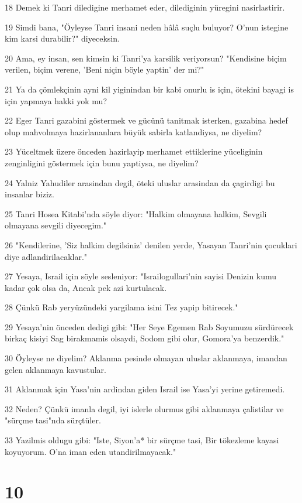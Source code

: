 \par 18 Demek ki Tanri diledigine merhamet eder, dilediginin yüregini nasirlastirir.
\par 19 Simdi bana, "Öyleyse Tanri insani neden hâlâ suçlu buluyor? O'nun istegine kim karsi durabilir?" diyeceksin.
\par 20 Ama, ey insan, sen kimsin ki Tanri'ya karsilik veriyorsun? "Kendisine biçim verilen, biçim verene, 'Beni niçin böyle yaptin' der mi?"
\par 21 Ya da çömlekçinin ayni kil yiginindan bir kabi onurlu is için, ötekini bayagi is için yapmaya hakki yok mu?
\par 22 Eger Tanri gazabini göstermek ve gücünü tanitmak isterken, gazabina hedef olup mahvolmaya hazirlananlara büyük sabirla katlandiysa, ne diyelim?
\par 23 Yüceltmek üzere önceden hazirlayip merhamet ettiklerine yüceliginin zenginligini göstermek için bunu yaptiysa, ne diyelim?
\par 24 Yalniz Yahudiler arasindan degil, öteki uluslar arasindan da çagirdigi bu insanlar biziz.
\par 25 Tanri Hosea Kitabi'nda söyle diyor: "Halkim olmayana halkim, Sevgili olmayana sevgili diyecegim."
\par 26 "Kendilerine, 'Siz halkim degilsiniz' denilen yerde, Yasayan Tanri'nin çocuklari diye adlandirilacaklar."
\par 27 Yesaya, Israil için söyle sesleniyor: "Israilogullari'nin sayisi Denizin kumu kadar çok olsa da, Ancak pek azi kurtulacak.
\par 28 Çünkü Rab yeryüzündeki yargilama isini Tez yapip bitirecek."
\par 29 Yesaya'nin önceden dedigi gibi: "Her Seye Egemen Rab Soyumuzu sürdürecek birkaç kisiyi Sag birakmamis olsaydi, Sodom gibi olur, Gomora'ya benzerdik."
\par 30 Öyleyse ne diyelim? Aklanma pesinde olmayan uluslar aklanmaya, imandan gelen aklanmaya kavustular.
\par 31 Aklanmak için Yasa'nin ardindan giden Israil ise Yasa'yi yerine getiremedi.
\par 32 Neden? Çünkü imanla degil, iyi islerle olurmus gibi aklanmaya çalistilar ve "sürçme tasi"nda sürçtüler.
\par 33 Yazilmis oldugu gibi: "Iste, Siyon'a* bir sürçme tasi, Bir tökezleme kayasi koyuyorum. O'na iman eden utandirilmayacak."

\chapter{10}

